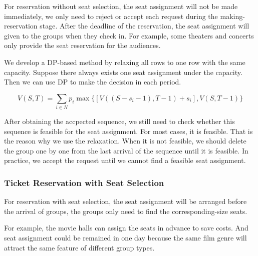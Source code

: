 For reservation without seat selection, the seat assignment will not be made immediately, we only need to reject or accept each request during the making-reservation stage. After the deadline of the reservation, the seat assignment will given to the groups when they check in. For example, some theaters and concerts only provide the seat reservation for the audiences.

We develop a DP-based method by relaxing all rows to one row with the same capacity.
Suppose there always exists one seat assignment under the capacity. Then we can use DP to make the decision in each period.

$$V(S,T) = \sum_{i \in N} p_i \max\{ {[V((S-s_i-1),T-1)+ s_i]}, {V(S,T-1)}\}$$

After obtaining the accpected sequence, we still need to check whether this sequence is feasible for the seat assignment. For most cases, it is feasible. That is the reason why we use the relaxation. When it is not feasible, we should delete the group one by one from the last arrival of the sequence until it is feasible. In practice, we accept the request until we cannot find a feasible seat assignment.




\subsubsection{Ticket Reservation with Seat Selection}
For reservation with seat selection, the seat assignment will be arranged before the arrival of groups, the groups only need to find the corresponding-size seats. 

For example, the movie halls can assign the seats in advance to save costs. And seat assignment could be remained in one day because the same film genre will attract the same feature of different group types.




